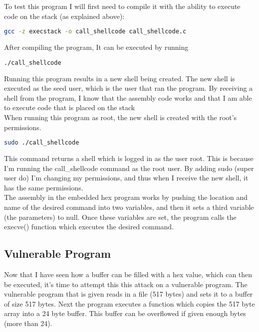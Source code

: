 \documentclass[14pt]{extarticle}
\begin{document}
To test this program I will first need to compile it with the ability to execute code on the stack (as explained above):
\begin{lstlisting}[language=bash]
     gcc -z execstack -o call_shellcode call_shellcode.c
\end{lstlisting}
After compiling the program, It can be executed by running
\begin{lstlisting}[language=bash]
    ./call_shellcode
\end{lstlisting}
Running this program results in a new shell being created. The new shell is executed as the seed user, which is the user that ran the program. By receiving a shell from the program, I know that the assembly code works and that I am able to execute code that is placed on the stack\\
When running this program as root, the new shell is created with the root's permissions.
\begin{lstlisting}[language=bash]
    sudo ./call_shellcode
\end{lstlisting}
This command returns a shell which is logged in as the user root. This is because I'm running the call\_shellcode command as the root user. By adding sudo (super user do) I'm changing my permissions, and thus when I receive the new shell, it has the same permissions.\\
The assembly in the embedded hex program works by pushing the location and name of the desired command into two variables, and then it sets a third variable (the parameters) to null. Once these  variables are set, the program calls the execve() function which executes the desired command. 

\subsection{Vulnerable Program}
Now that I have seen how a buffer can be filled with a hex value, which can then be executed, it's time to attempt this this attack on a vulnerable program. The vulnerable program that is given reads in a file (517 bytes) and sets it to a buffer of size 517 bytes. Next the program executes a function which copies the 517 byte array into a 24 byte buffer. This buffer can be overflowed if given enough bytes (more than 24). 
\end{document}
